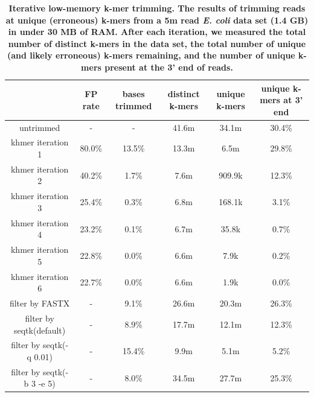 \documentclass[10pt]{article}
\begin{document}

\begin{table}[!ht]
\caption{
\bf{Iterative low-memory k-mer trimming.  The results of trimming
  reads at unique (erroneous) k-mers from a 5m read {\em E. coli} data set (1.4 GB)
  in under 30 MB of RAM.  After each iteration, we measured the
  total number of distinct k-mers in the data set, the total number
  of unique (and likely erroneous) k-mers remaining, and the
  number of unique k-mers present at the 3' end of reads.}}
\begin{tabular}{ | c | c | c | c | c | c |}
\hline
 & FP rate & bases trimmed & distinct k-mers & unique k-mers & 
unique k-mers at 3' end \\
\hline
untrimmed                           &      -  &      - & 41.6m & 34.1m & 30.4\%  \\
khmer iteration 1                   & 80.0\%  & 13.5\% & 13.3m &  6.5m & 29.8\% \\
khmer iteration 2                   & 40.2\%  &  1.7\% &  7.6m & 909.9k & 12.3\% \\
khmer iteration 3                   & 25.4\%  &  0.3\% &  6.8m & 168.1k & 3.1\% \\
khmer iteration 4                   & 23.2\%  &  0.1\% &  6.7m &  35.8k & 0.7\% \\
khmer iteration 5                   & 22.8\%  &  0.0\% &  6.6m &   7.9k & 0.2\% \\
khmer iteration 6                   & 22.7\%  &  0.0\% &  6.6m &   1.9k & 0.0\% \\
filter by FASTX                     &      -  &  9.1\% & 26.6m & 20.3m & 26.3\% \\
filter by seqtk(default)            &      -  &  8.9\% & 17.7m & 12.1m & 12.3\% \\
filter by seqtk(-q 0.01)            &      -  & 15.4\% &  9.9m &  5.1m &  5.2\% \\
filter by seqtk(-b 3 -e 5)          &      -  &  8.0\% & 34.5m & 27.7m & 25.3\% \\
\end{tabular}
\begin{flushleft}
\end{flushleft}
\label{table:loop_trim}
\end{table}


\end{document}
